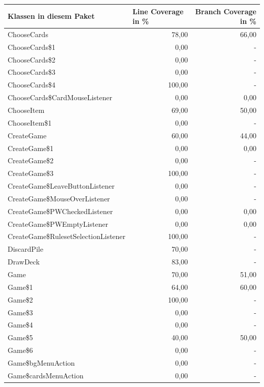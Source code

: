 \documentclass[a4paper]{article}
\begin{document}
\noindent
\begin{tabular}{|l|r|r|}
\hline
Klassen in diesem Paket & \multicolumn{1}{l|}{Line Coverage in \%} & Branch Coverage in \% \\ \hline \hline
ChooseCards & 78,00 & \multicolumn{1}{r|}{66,00} \\ \hline
ChooseCards\$1 & 0,00 & - \\ \hline
ChooseCards\$2 & 0,00 & - \\ \hline
ChooseCards\$3 & 0,00 & - \\ \hline
ChooseCards\$4 & 100,00 & - \\ \hline
ChooseCards\$CardMouseListener & 0,00 & \multicolumn{1}{r|}{0,00} \\ \hline
ChooseItem & 69,00 & \multicolumn{1}{r|}{50,00} \\ \hline
ChooseItem\$1 & 0,00 & - \\ \hline
CreateGame & 60,00 & \multicolumn{1}{r|}{44,00} \\ \hline
CreateGame\$1 & 0,00 & \multicolumn{1}{r|}{0,00} \\ \hline
CreateGame\$2 & 0,00 & - \\ \hline
CreateGame\$3 & 100,00 & - \\ \hline
CreateGame\$LeaveButtonListener & 0,00 & - \\ \hline
CreateGame\$MouseOverListener & 0,00 & - \\ \hline
CreateGame\$PWCheckedListener & 0,00 & \multicolumn{1}{r|}{0,00} \\ \hline
CreateGame\$PWEmptyListener & 0,00 & \multicolumn{1}{r|}{0,00} \\ \hline
CreateGame\$RulesetSelectionListener & 100,00 & - \\ \hline
DiscardPile & 70,00 & - \\ \hline
DrawDeck & 83,00 & - \\ \hline
Game & 70,00 & \multicolumn{1}{r|}{51,00} \\ \hline
Game\$1 & 64,00 & \multicolumn{1}{r|}{60,00} \\ \hline
Game\$2 & 100,00 & - \\ \hline
Game\$3 & 0,00 & - \\ \hline
Game\$4 & 0,00 & - \\ \hline
Game\$5 & 40,00 & \multicolumn{1}{r|}{50,00} \\ \hline
Game\$6 & 0,00 & - \\ \hline
Game\$bgMenuAction & 0,00 & - \\ \hline
Game\$cardsMenuAction & 0,00 & - \\ \hline

\end{tabular}
\end{document}
